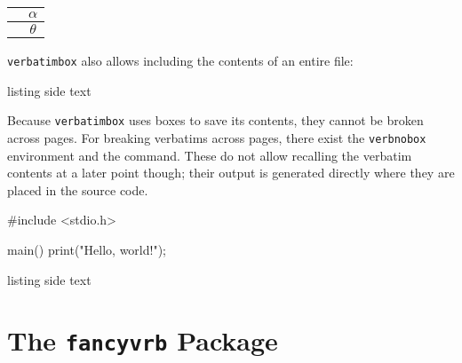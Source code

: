 \documentclass[article,a4paper,oneside,10pt]{memoir}
\newcommand\code[1]{\texttt{#1}}
\begin{document}
\vfill

\begin{tcblisting}{}
    \begin{myverbbox}{\vtheta}\theta\end{myverbbox}
    \begin{myverbbox}{\valpha}\alpha\end{myverbbox}
    \begin{tabular}{|c|c|} \hline
    \valpha & $\alpha$ \\ \hline
    \vtheta & $\theta$ \\ \hline
    \end{tabular}
\end{tcblisting}

\newpage
\code{verbatimbox} also allows including the contents of an entire file:

\begin{tcblisting}{listing side text}
    \theverbbox
\end{tcblisting}

Because  \code{verbatimbox}  uses boxes  to  save  its contents,  they  cannot
be  broken across  pages. For  breaking verbatims  across  pages, there  exist
the  \code{verbnobox}  environment and  the  \texttt{\verbfilenobox}
command. These do not  allow recalling the verbatim contents at  a later point
though; their output is generated directly where they are placed in the source
code.


\begin{tcblisting}{}
    \begin{verbnobox}
    #include <stdio.h>

    main() {
        print("Hello, world!\n");
    }
    \end{verbnobox}
\end{tcblisting}

\begin{tcblisting}{listing side text}
\end{tcblisting}

% ========================================================================== %
\newpage
\chapter{The \code{fancyvrb} Package \cite{fancyvrb}}
\label{chap:fancyvrb}
\end{document}
